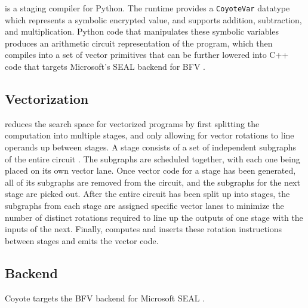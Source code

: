 \system is a staging compiler for Python.
The runtime provides a \texttt{CoyoteVar} datatype which represents a symbolic encrypted value, and supports addition, subtraction, and multiplication.
Python code that manipulates these symbolic variables produces an arithmetic circuit representation of the program, which \system then compiles into a set of vector primitives that can be further lowered into C++ code that targets Microsoft's SEAL backend for BFV .
 
\subsection{Vectorization}
\system reduces the search space for vectorized programs  by first splitting the computation into multiple stages, and only allowing for vector rotations to line operands up between stages.
A stage consists of a set of independent subgraphs of the entire circuit . 
The subgraphs are scheduled together, with each one being placed on its own vector lane. 
Once vector code for a stage has been generated, all of its subgraphs are removed from the circuit, and the subgraphs for the next stage are picked out.
After the entire circuit has been split up into stages, the subgraphs from each stage are assigned specific vector lanes to minimize the number of distinct rotations required to line up the outputs of one stage with the inputs of the next.
Finally, \system computes and inserts these rotation instructions between stages and emits the vector code.

\subsection{Backend}
Coyote targets the BFV backend for Microsoft SEAL .